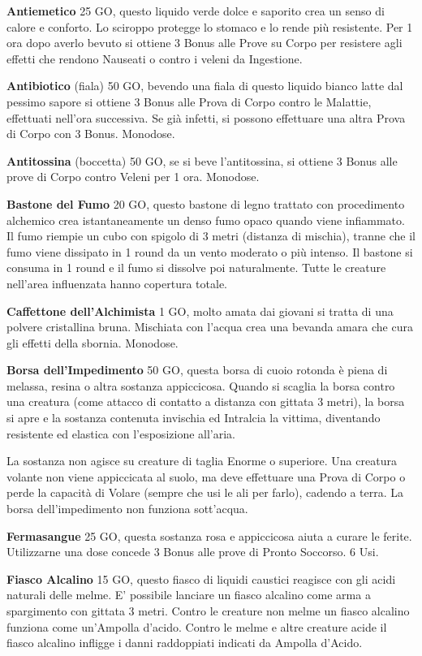 \documentclass[12pt,a4paper,twoside,openany]{book}
\begin{document}
\begin{multicols}{2}
\textbf{Antiemetico} 25 GO,  questo liquido verde dolce e saporito crea un senso di calore e conforto. Lo sciroppo protegge lo stomaco e lo rende più resistente. Per 1 ora dopo averlo bevuto si ottiene 3 Bonus alle Prove su Corpo per resistere agli effetti che rendono Nauseati o contro i veleni da Ingestione.

\textbf{Antibiotico} (fiala) 50 GO, bevendo una fiala di questo liquido bianco latte dal pessimo sapore si ottiene 3 Bonus alle Prova di Corpo contro le Malattie, effettuati nell'ora successiva. Se già infetti, si possono effettuare una altra Prova di Corpo con 3 Bonus. Monodose. 

\textbf{Antitossina} (boccetta) 50 GO, se si beve l'antitossina, si ottiene 3 Bonus alle prove di Corpo contro Veleni per 1 ora. Monodose. 

\textbf{Bastone del Fumo} 20 GO, questo bastone di legno trattato con procedimento alchemico crea istantaneamente un denso fumo opaco quando viene infiammato. Il fumo riempie un cubo con spigolo di 3 metri (distanza di mischia), tranne che il fumo viene dissipato in 1 round da un vento moderato o più intenso. Il bastone si consuma in 1 round e il fumo si dissolve poi naturalmente. Tutte le creature nell'area influenzata hanno copertura totale.

\textbf{Caffettone dell'Alchimista} 1 GO, molto amata dai giovani si tratta di una polvere cristallina bruna. Mischiata con l'acqua crea una bevanda amara che cura gli effetti della sbornia. Monodose.

\textbf{Borsa dell'Impedimento} 50 GO, questa borsa di cuoio rotonda è piena di melassa, resina o altra sostanza appiccicosa. Quando si scaglia la borsa contro una creatura (come attacco di contatto a distanza con gittata 3 metri), la borsa si apre e la sostanza contenuta invischia ed Intralcia la vittima, diventando resistente ed elastica con l'esposizione all'aria.

La sostanza non agisce su creature di taglia Enorme o superiore. Una creatura volante non viene appiccicata al suolo, ma deve effettuare una Prova di Corpo o perde la capacità di Volare (sempre che usi le ali per farlo), cadendo a terra. La borsa dell'impedimento non funziona sott'acqua.

\textbf{Fermasangue} 25 GO, questa sostanza rosa e appiccicosa aiuta a curare le ferite. Utilizzarne una dose concede 3 Bonus alle prove di Pronto Soccorso. 6 Usi.

\textbf{Fiasco Alcalino} 15 GO, questo fiasco di liquidi caustici reagisce con gli acidi naturali delle melme. E' possibile lanciare un fiasco alcalino come arma a spargimento con gittata 3 metri. Contro le creature non melme un fiasco alcalino funziona come un'Ampolla d'acido. Contro le melme e altre creature acide il fiasco alcalino infligge i danni raddoppiati indicati da Ampolla d'Acido. 


\end{multicols}
\end{document}
